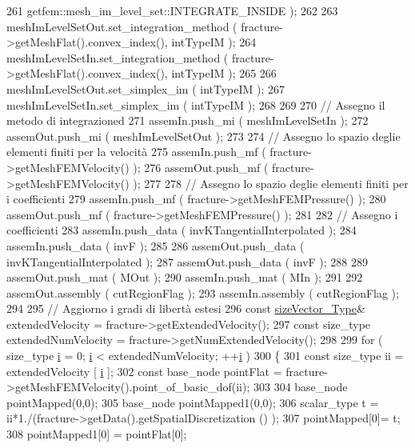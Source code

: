 \begin{DoxyCode}
261                                                  getfem::mesh\_im\_level\_set::INTEGRATE\_INSIDE );
262 
263     meshImLevelSetOut.set\_integration\_method ( fracture->getMeshFlat().convex\_index(), intTypeIM );
264     meshImLevelSetIn.set\_integration\_method ( fracture->getMeshFlat().convex\_index(), intTypeIM );
265 
266     meshImLevelSetOut.set\_simplex\_im ( intTypeIM );
267     meshImLevelSetIn.set\_simplex\_im ( intTypeIM );
268 
269 
270     \textcolor{comment}{// Assegno il metodo di integrazioned}
271     assemIn.push\_mi ( meshImLevelSetIn );
272     assemOut.push\_mi ( meshImLevelSetOut );
273 
274     \textcolor{comment}{// Assegno lo spazio deglie elementi finiti per la velocità}
275     assemIn.push\_mf ( fracture->getMeshFEMVelocity() );
276     assemOut.push\_mf ( fracture->getMeshFEMVelocity() );
277 
278     \textcolor{comment}{// Assegno lo spazio deglie elementi finiti per i coefficienti}
279     assemIn.push\_mf ( fracture->getMeshFEMPressure() );
280     assemOut.push\_mf ( fracture->getMeshFEMPressure() );
281 
282     \textcolor{comment}{// Assegno i coefficienti}
283     assemIn.push\_data ( invKTangentialInterpolated );
284     assemIn.push\_data ( invF );
285 
286     assemOut.push\_data ( invKTangentialInterpolated );
287     assemOut.push\_data ( invF );
288 
289     assemOut.push\_mat ( MOut );
290     assemIn.push\_mat ( MIn );
291 
292     assemOut.assembly ( cutRegionFlag );
293     assemIn.assembly ( cutRegionFlag );
294 
295     \textcolor{comment}{// Aggiorno i gradi di libertà estesi}
296     \textcolor{keyword}{const} \hyperlink{Core_8h_a83c51913d041a5001e8683434c09857f}{sizeVector\_Type}& extendedVelocity = fracture->getExtendedVelocity();
297     \textcolor{keyword}{const} size\_type extendedNumVelocity = fracture->getNumExtendedVelocity();
298 
299     \textcolor{keywordflow}{for} ( size\_type \hyperlink{matrici_8m_a6f6ccfcf58b31cb6412107d9d5281426}{i} = 0; \hyperlink{matrici_8m_a6f6ccfcf58b31cb6412107d9d5281426}{i} < extendedNumVelocity; ++\hyperlink{matrici_8m_a6f6ccfcf58b31cb6412107d9d5281426}{i} )
300     \{
301         \textcolor{keyword}{const} size\_type ii = extendedVelocity [ \hyperlink{matrici_8m_a6f6ccfcf58b31cb6412107d9d5281426}{i} ];
302         \textcolor{keyword}{const} base\_node pointFlat = fracture->getMeshFEMVelocity().point\_of\_basic\_dof(ii);
303         
304         base\_node pointMapped(0,0);
305         base\_node pointMapped1(0,0);
306         scalar\_type t = ii*1./(fracture->getData().getSpatialDiscretization () );
307         pointMapped[0]= t;
308         pointMapped1[0] = pointFlat[0];

\end{DoxyCode}
